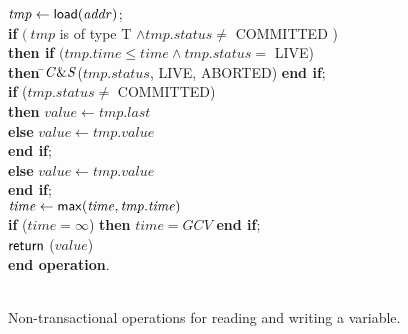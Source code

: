 \documentclass[11pt,letterpaper]{article}
\begin{document}
\begin{figure}[htb]
{{\begin{minipage}[t]{150mm}
\begin{tabbing}
 \> $\mathit{tmp} \gets {\sf load}(\mathit{addr})$; \\ 
 \> {\bf if} $( ~\mathit{tmp}$ is of type T $ \wedge \mathit{tmp.status} \neq$ COMMITTED ) \\
  \>\>  {\bf then if}  $(\mathit{tmp.time}  \leq \mathit{time}  \wedge  \mathit{tmp.status} = $ LIVE) \\
 \>\>\>\> {\bf then} \=${\sf \mathit{C\&S}}$($tmp.status$, LIVE, ABORTED) {\bf end if}; \\
 \>\>\> {\bf if} ($tmp.status \neq $ COMMITTED)  \\
 \>\>\>\> {\bf then} $\mathit{value} \gets \mathit{tmp.last}$ \\
 \>\>\>\> {\bf else} $\mathit{value} \gets \mathit{tmp.value}$ \\
 \>\>\> {\bf end if}; \\
 \>\> {\bf else} $\mathit{value} \gets \mathit{tmp.value}$ \\
 \> {\bf end if}; \\
 \> $\mathit{time} \gets {\sf max}(\mathit{time}, \mathit{tmp.time})$ \\
 \> {\bf if} ($\mathit{time} = \infty$) {\bf then} $\mathit{time} = \mathit{GCV}$ {\bf end if}; \\
 \> ${\sf return}$ ($\mathit{value}$) \\
{\bf end operation}. \\
\\

\end{tabbing}
\normalsize
\end{minipage}
}
\caption{Non-transactional operations for reading and writing a variable.}
\label{fig:ntops}
}
\end{figure}
\end{document}
